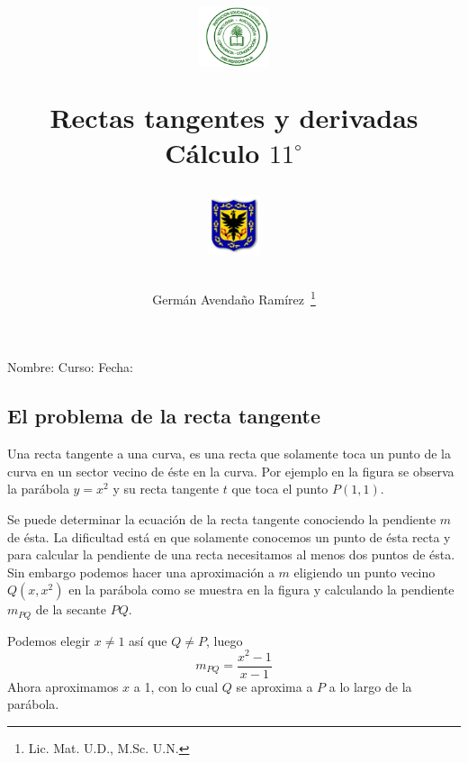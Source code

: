 \documentclass[letterpaper,twoside]{article}
\author{Germ\'an Avenda\~no Ram\'irez~\thanks{Lic. Mat. U.D., M.Sc. U.N.}}
\title{\begin{minipage}{.2\textwidth}
\includegraphics[height=1.75cm]{Images/logo-colegio.png}\end{minipage}
\begin{minipage}{.55\textwidth}
\begin{center}
Rectas tangentes y derivadas\\
Cálculo $11^{\circ}$
\end{center}
\end{minipage}\hfill
\begin{minipage}{.2\textwidth}
\includegraphics[height=1.75cm]{Images/logo-sed.png} 
\end{minipage}}
\date{}
\begin{document}
\maketitle
Nombre: \hrulefill Curso: \underline{\hspace*{44pt}} Fecha: \underline{\hspace*{2.5cm}}
\begin{multicols}{2}
\section*{El problema de la recta tangente}
Una recta tangente a una curva, es una recta que solamente toca un punto de la curva en un sector vecino de éste en la curva. Por ejemplo en la figura se observa la parábola $y=x^{2}$ y su recta tangente $t$ que toca el punto $P(1,1)$. 
\begin{center}
\end{center}
Se puede determinar la ecuación de la recta tangente conociendo la pendiente $m$ de ésta. La dificultad está en que solamente conocemos un punto de ésta recta y para calcular la pendiente de una recta necesitamos al menos dos puntos de ésta. Sin embargo podemos hacer una aproximación a $m$ eligiendo un punto vecino $Q(x,x^{2})$ en la parábola como se muestra en la figura y calculando la pendiente $m_{PQ}$ de la secante $PQ$.
\begin{center}
\end{center}
Podemos elegir $x\neq 1$ así que $Q\neq P$, luego
\[m_{PQ}=\dfrac{x^{2}-1}{x-1}\]
Ahora aproximamos $x$ a 1, con lo cual $Q$ se aproxima a $P$ a lo largo de la parábola. 


\end{multicols}
\end{document}
